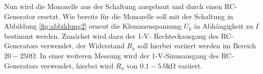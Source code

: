 Nun wird die Monozelle aus der Schaltung ausgebaut und durch einen RC-Generator ersetzt. Wie bereits für die Monozelle soll mit der Schaltung in Abbildung \ref{fig:abbildung2} erneut die Klemmenspannung $U_k$ in Abhängigkeit zu $I$ bestimmt werden. Zunächst wird dazu der 1-V- Rechteckausgang des RC-Generators verwendet, der Widerstand $R_a$ soll hierbei variiert werden im Bereich $20-250\si{\ohm}$.
In einer weiteren Messung wird der 1-V-Sinusausgang des RC-Generators verwendet, hierbei wird $R_a$ von $0.1-5.0\si{\kilo\ohm}$ variiert.

